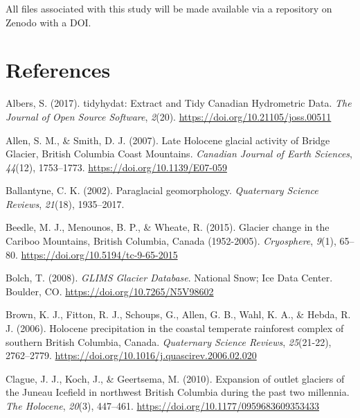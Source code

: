 \documentclass[
  letterpaper,
  DIV=11,
  numbers=noendperiod]{scrartcl}
\newlength{\cslhangindent}
\newlength{\cslentryspacingunit} %
\newenvironment{CSLReferences}[2] %
 {%
  \setlength{\parindent}{0pt}
  \ifodd #1
  \let\oldpar\par
  \def\par{\hangindent=\cslhangindent\oldpar}
  \fi
  \setlength{\parskip}{#2\cslentryspacingunit}
 }%
 {}
\begin{document}
All files associated with this study will be made available via a
repository on Zenodo with a DOI.

\pagebreak

\hypertarget{references}{%
\section{References}\label{references}}

\hypertarget{refs}{}
\begin{CSLReferences}{1}{0}
\leavevmode{}%
Albers, S. (2017). {tidyhydat: Extract and Tidy Canadian Hydrometric
Data}. \emph{The Journal of Open Source Software}, \emph{2}(20).
\url{https://doi.org/10.21105/joss.00511}

\leavevmode{}%
Allen, S. M., \& Smith, D. J. (2007). {Late Holocene glacial activity of
Bridge Glacier, British Columbia Coast Mountains}. \emph{Canadian
Journal of Earth Sciences}, \emph{44}(12), 1753--1773.
\url{https://doi.org/10.1139/E07-059}

\leavevmode{}%
Ballantyne, C. K. (2002). {Paraglacial geomorphology}. \emph{Quaternary
Science Reviews}, \emph{21}(18), 1935--2017.

\leavevmode{}%
Beedle, M. J., Menounos, B. P., \& Wheate, R. (2015). {Glacier change in
the Cariboo Mountains, British Columbia, Canada (1952-2005)}.
\emph{Cryosphere}, \emph{9}(1), 65--80.
\url{https://doi.org/10.5194/tc-9-65-2015}

\leavevmode{}%
Bolch, T. (2008). \emph{{GLIMS Glacier Database}}. National Snow; Ice
Data Center. Boulder, CO. \url{https://doi.org/10.7265/N5V98602}

\leavevmode{}%
Brown, K. J., Fitton, R. J., Schoups, G., Allen, G. B., Wahl, K. A., \&
Hebda, R. J. (2006). {Holocene precipitation in the coastal temperate
rainforest complex of southern British Columbia, Canada}.
\emph{Quaternary Science Reviews}, \emph{25}(21-22), 2762--2779.
\url{https://doi.org/10.1016/j.quascirev.2006.02.020}

\leavevmode{}%
Clague, J. J., Koch, J., \& Geertsema, M. (2010). {Expansion of outlet
glaciers of the Juneau Icefield in northwest British Columbia during the
past two millennia}. \emph{The Holocene}, \emph{20}(3), 447--461.
\url{https://doi.org/10.1177/0959683609353433}


\end{CSLReferences}
\end{document}
